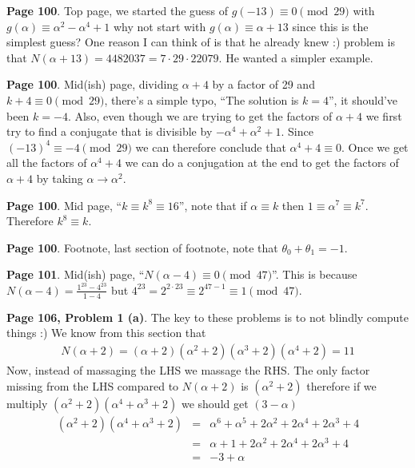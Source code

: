 \documentclass[aps,preprint,preprintnumbers,nofootinbib,showpacs,prd]{revtex4-1}
\newcommand{\nbea}{\begin{eqnarray*}}
\newcommand{\neea}{\end{eqnarray*}}
\begin{document}
{\bf Page 100}. Top page, we started the guess of $g(-13) \equiv 0 \pmod{29}$ with $g(\alpha) \equiv \alpha^2 - \alpha^4 + 1$ why not start with $g(\alpha) \equiv \alpha + 13$ since this is the simplest guess? One reason I can think of is that he already knew :) problem is that $N(\alpha + 13) = 4482037 = 7 \cdot 29 \cdot 22079$. He wanted a simpler example.

{\bf Page 100}. Mid(ish) page, dividing $\alpha + 4$ by a factor of 29 and $k + 4 \equiv 0 \pmod{29}$, there's a simple typo, ``The solution is $k = 4$'', it should've been $k = -4$. Also, even though we are trying to get the factors of $\alpha + 4$ we first try to find a conjugate that is divisible by $-\alpha^4 + \alpha^2 + 1$. Since $(-13)^4 \equiv -4 \pmod{29}$ we can therefore conclude that $\alpha^4 + 4 \equiv 0$. Once we get all the factors of $\alpha^4 + 4$ we can do a conjugation at the end to get the factors of $\alpha + 4$ by taking $\alpha \to \alpha^2$.

{\bf Page 100}. Mid page, ``$k \equiv k^8 \equiv 16$'', note that if $\alpha \equiv k$ then $1 \equiv \alpha^7 \equiv k^7$. Therefore $k^8 \equiv k$.

{\bf Page 100}. Footnote, last section of footnote, note that $\theta_0 + \theta_1 = -1$.

{\bf Page 101}. Mid(ish) page, ``$N(\alpha - 4) \equiv 0 \pmod{47}$''. This is because $N(\alpha - 4) = \frac{1^{23} - 4^{23}}{1 - 4}$ but $4^{23} = 2^{2\cdot 23} \equiv 2^{47-1} \equiv 1 \pmod{47}$.

{\bf Page 106, Problem 1 (a)}. The key to these problems is to not blindly compute things :) We know from this section that
%
\nbea
N(\alpha + 2) = (\alpha + 2)(\alpha^2 + 2)(\alpha^3 + 2)(\alpha^4 + 2) = 11
\neea
%
Now, instead of massaging the LHS we massage the RHS. The only factor missing from the LHS compared to $N(\alpha + 2)$ is $(\alpha^2 + 2)$ therefore if we multiply $(\alpha^2 + 2)(\alpha^4 + \alpha^3 + 2)$ we should get $(3 - \alpha)$
%
\nbea
(\alpha^2 + 2)(\alpha^4 + \alpha^3 + 2) & = & \alpha^6 + \alpha^5 + 2\alpha^2 + 2\alpha^4 + 2\alpha^3 + 4 \\
& = & \alpha + 1 + 2\alpha^2 + 2\alpha^4 + 2\alpha^3 + 4 \\
& = & -3 + \alpha
\neea
%
\end{document}
